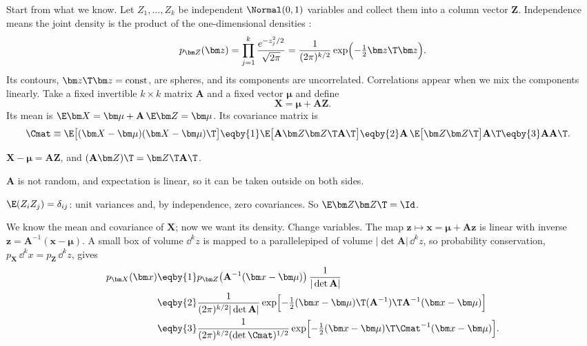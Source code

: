 Start from what we know. Let $Z_1,\dots,Z_k$ be independent $\Normal(0,1)$ variables and collect them into a column vector $\bm Z$. Independence means the joint density is the product of the one-dimensional densities :
\begin{equation}
  p_{\bm Z}(\bm z)=\prod_{j=1}^k\frac{e^{-z_j^2/2}}{\sqrt{2\pi}}=\frac{1}{(2\pi)^{k/2}}\exp\Bigl(-\tfrac12\bm z\T\bm z\Bigr).
  \label{2b:eq:mvn-std}
\end{equation}
Its contours, $\bm z\T\bm z=\text{const}$, are spheres, and its components are uncorrelated. Correlations appear when we mix the components linearly. Take a fixed invertible $k\times k$ matrix $\mathbf A$ and a fixed vector $\bm\mu$ and define
\begin{equation}
  \bm X=\bm\mu+\mathbf A\bm Z .
  \label{2b:eq:mvn-map}
\end{equation}
Its mean is $\E\bm X=\bm\mu+\mathbf A\,\E\bm Z=\bm\mu$. Its covariance matrix  is
\begin{align}
  \Cmat\equiv\E\bigl[(\bm X-\bm\mu)(\bm X-\bm\mu)\T\bigr]
  &\eqby{1} \E\bigl[\mathbf A\bm Z\bm Z\T\mathbf A\T\bigr]
  \eqby{2} \mathbf A\,\E\bigl[\bm Z\bm Z\T\bigr]\mathbf A\T
  \eqby{3} \mathbf A\mathbf A\T .
  \label{2b:eq:mvn-cov}
\end{align}
\begin{explain}
  \item $\bm X-\bm\mu=\mathbf A\bm Z$, and $(\mathbf A\bm Z)\T=\bm Z\T\mathbf A\T$.
  \item $\mathbf A$ is not random, and expectation is linear, so it can be taken outside on both sides.
  \item $\E(Z_iZ_j)=\delta_{ij}$: unit variances and, by independence, zero covariances. So $\E\bm Z\bm Z\T=\Id$.
\end{explain}
We know the mean and covariance of $\bm X$; now we want its density. Change variables. The map $\bm z\mapsto\bm x=\bm\mu+\mathbf A\bm z$ is linear with inverse $\bm z=\mathbf A^{-1}(\bm x-\bm\mu)$. A small box of volume $\dd^k z$ is mapped to a parallelepiped of volume $|\det\mathbf A|\,\dd^kz$, so probability conservation, $p_{\bm X}\,\dd^kx=p_{\bm Z}\,\dd^kz$, gives
\begin{align}
  p_{\bm X}(\bm x)
  &\eqby{1} p_{\bm Z}\bigl(\mathbf A^{-1}(\bm x-\bm\mu)\bigr)\,\frac{1}{|\det\mathbf A|} \nonumber\\
  &\eqby{2} \frac{1}{(2\pi)^{k/2}|\det\mathbf A|}\exp\Bigl[-\tfrac12(\bm x-\bm\mu)\T(\mathbf A^{-1})\T\mathbf A^{-1}(\bm x-\bm\mu)\Bigr] \nonumber\\
  &\eqby{3} \frac{1}{(2\pi)^{k/2}(\det\Cmat)^{1/2}}\exp\Bigl[-\tfrac12(\bm x-\bm\mu)\T\Cmat^{-1}(\bm x-\bm\mu)\Bigr].
  \label{2b:eq:mvn}
\end{align}
